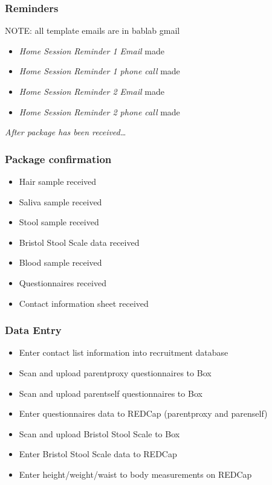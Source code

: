 \documentclass[]{book}
\providecommand{\tightlist}{%
  \setlength{\itemsep}{0pt}\setlength{\parskip}{0pt}}
\begin{document}
\hypertarget{reminders-6}{%
\subsubsection{Reminders}\label{reminders-6}}

NOTE: all template emails are in bablab gmail

\begin{itemize}
\tightlist
\item
  \emph{Home Session Reminder 1 Email} made
\item
  \emph{Home Session Reminder 1 phone call} made
\item
  \emph{Home Session Reminder 2 Email} made
\item
  \emph{Home Session Reminder 2 phone call} made
\end{itemize}

\emph{After package has been received\ldots{}}

\hypertarget{package-confirmation-2}{%
\subsubsection{Package confirmation}\label{package-confirmation-2}}

\begin{itemize}
\tightlist
\item
  Hair sample received
\item
  Saliva sample received
\item
  Stool sample received
\item
  Bristol Stool Scale data received
\item
  Blood sample received
\item
  Questionnaires received
\item
  Contact information sheet received
\end{itemize}

\hypertarget{data-entry-7}{%
\subsubsection{Data Entry}\label{data-entry-7}}

\begin{itemize}
\tightlist
\item
  Enter contact list information into recruitment database
\item
  Scan and upload parentproxy questionnaires to Box
\item
  Scan and upload parentself questionnaires to Box
\item
  Enter questionnaires data to REDCap (parentproxy and parenself)
\item
  Scan and upload Bristol Stool Scale to Box
\item
  Enter Bristol Stool Scale data to REDCap
\item
  Enter height/weight/waist to body measurements on REDCap
\end{itemize}
\end{document}
